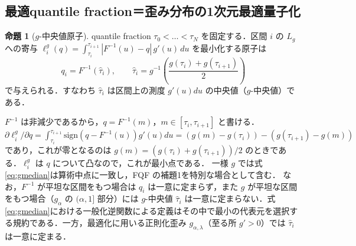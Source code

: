 \documentclass[a4paper,10pt]{jsarticle}
\makeatletter
\theoremstyle{definition}
\newtheorem{proposition}{命題}[section]
\renewenvironment{proof}[1][\proofname]{\par
  \pushQED{\qed}%
  \normalfont \topsep6\p@\@plus6\p@\relax
  \trivlist
  \item[\hskip\labelsep\textbf{#1}]\ignorespaces
}{%
  \popQED\endtrivlist\@endpefalse
}
\renewcommand{\proofname}{証明}
\newcommand{\Finv}{F^{-1}}
\makeatother
\begin{document}
\subsection{最適quantile fraction＝歪み分布の1次元最適量子化}
\begin{proposition}[$g$-中央値原子]
\label{prop:gmedian}
quantile fraction $\tau_0<\dots<\tau_N$ を固定する．区間 $i$ の $L_g$ への寄与
$\ell^g_i(q)=\int_{\tau_i}^{\tau_{i+1}}|\Finv(u)-q|\,g'(u)\,du$ を最小化する原子は
\begin{equation}
  q_i=\Finv(\hat\tau_i),\qquad \hat\tau_i=g^{-1}\!\left(\frac{g(\tau_i)+g(\tau_{i+1})}{2}\right)
  \label{eq:gmedian}
\end{equation}
で与えられる．すなわち $\hat\tau_i$ は区間上の測度 $g'(u)du$ の中央値（$g$-中央値）である．
\end{proposition}
\begin{proof}
$\Finv$ は非減少であるから，$q=\Finv(m)$，$m\in[\tau_i,\tau_{i+1}]$ と書ける．
$\partial\ell_i^g/\partial q=\int_{\tau_i}^{\tau_{i+1}}\mathrm{sign}(q-\Finv(u))g'(u)du
=\left(g(m)-g(\tau_i)\right)-\left(g(\tau_{i+1})-g(m)\right)$ であり，これが零となるのは
$g(m)=(g(\tau_i)+g(\tau_{i+1}))/2$ のときである．$\ell^g_i$ は $q$ について凸なので，これが最小点である．
\end{proof}
一様 $g$ では式\eqref{eq:gmedian}は算術中点に一致し，FQF の補題1を特別な場合として含む．
なお，$\Finv$ が平坦な区間をもつ場合は $q_i$ は一意に定まらず，また $g$ が平坦な区間をもつ場合（$g_\alpha$ の $(\alpha,1]$ 部分）には $g$-中央値 $\hat\tau_i$ は一意に定まらない．式\eqref{eq:gmedian}における一般化逆関数による定義はその中で最小の代表元を選択する規約である．一方，最適化に用いる正則化歪み $g_{\alpha,\lambda}$（至る所 $g'>0$）では $\hat\tau_i$ は一意に定まる．
\end{document}
